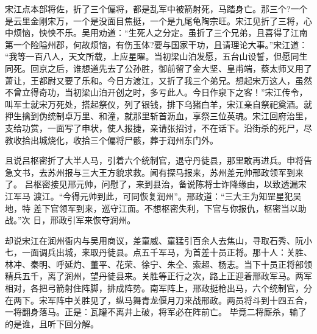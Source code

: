 宋江点本部将佐，折了三个偏将，都是乱军中被箭射死，马踏身亡。那三个?一个
是云里金刚宋万，一个是没面目焦挺，一个是九尾龟陶宗旺。宋江见折了三将，心
中烦恼，怏怏不乐。吴用劝道：“生死人之分定。虽折了三个兄弟，且喜得了江南
第一个险隘州郡，何故烦恼，有伤玉体?要与国家干功，且请理论大事。”宋江道：
“我等一百八人，天文所载，上应星曜。当初梁山泊发愿，五台山设誓，但愿同生
同死。回京之后，谁想道先去了公孙胜，御前留了金大坚、皇甫端，蔡太师又用了
萧让，王都尉又要了乐和。今日方渡江，又折了我三个弟兄。想起宋万这人，虽然
不曾立得奇功，当初梁山泊开创之时，多亏此人。今日作泉下之客！”宋江传令，
叫军士就宋万死处，搭起祭仪，列了银钱，排下乌猪白羊，宋江亲自祭祀奠酒。就
押生擒到伪统制卓万里、和潼，就那里斩首沥血，享祭三位英魂。宋江回府治里，
支给功赏，一面写了申状，使人报捷，亲请张招讨，不在话下。沿街杀的死尸，尽
教收拾出城烧化，收拾三个偏将尸骸，葬于润州东门外。

且说吕枢密折了大半人马，引着六个统制官，退守丹徒县，那里敢再进兵。申将告
急文书，去苏州报与三大王方貌求救。闻有探马报来，苏州差元帅邢政领军到来了。
吕枢密接见邢元帅，问慰了，来到县治，备说陈将士诈降缘由，以致透漏宋江军马
渡江。“今得元帅到此，可同恢复润州”。邢政道：“三大王为知罡星犯吴地，特
差下官领军到来，巡守江面。不想枢密失利，下官与你报仇，枢密当以助战。”次
日，邢政引军来恢夺润州。

却说宋江在润州衙内与吴用商议，差童威、童猛引百余人去焦山，寻取石秀、阮小
七，一面调兵出城，来取丹徒县。点五千军马，为首差十员正将。那十人：关胜、
林冲、秦明、呼延灼、董平、花荣、徐宁、朱仝、索超、杨志。当下十员正将部领
精兵五千，离了润州，望丹徒县来。关胜等正行之次，路上正迎着邢政军马。两军
相对，各把弓箭射住阵脚，排成阵势。南军阵上，邢政挺枪出马，六个统制官，分
在两下。宋军阵中关胜见了，纵马舞青龙偃月刀来战邢政。两员将斗到十四五合，
一将翻身落马。正是：瓦罐不离井上破，将军必在阵前亡。
毕竟二将厮杀，输了的是谁，且听下回分解。
